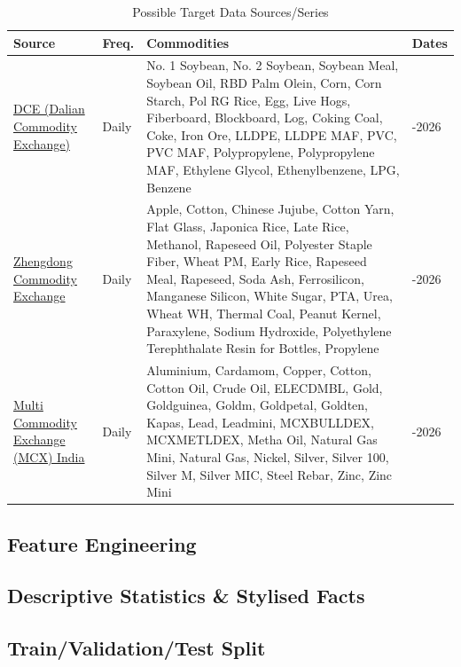 \vspace{-10pt}
\begin{table}[h!]
\caption{Possible Target Data Sources/Series}
\label{tab:target-data-sources}
\footnotesize

\begin{tabularx}{\textwidth}{
    @{}
    >{\raggedright\arraybackslash}p{}
    >{\raggedright\arraybackslash}p{}
    >{\raggedright\arraybackslash}X
    >{\raggedright\arraybackslash}p{}
    @{}
}
\toprule
\textbf{Source} &
\textbf{Freq.} &
\textbf{Commodities} &
\textbf{Dates} \\
\midrule
\href{http://www.dce.com.cn/dceg/channel/list/468.html}{DCE (Dalian Commodity Exchange)} &
Daily &
No. 1 Soybean, No. 2 Soybean, Soybean Meal, Soybean Oil,
RBD Palm Olein, Corn, Corn Starch, Pol RG Rice, Egg, Live Hogs,
Fiberboard, Blockboard, Log, Coking Coal, Coke, Iron Ore,
LLDPE, LLDPE MAF, PVC, PVC MAF, Polypropylene,
Polypropylene MAF, Ethylene Glycol, Ethenylbenzene, LPG,
Benzene &
2006-2026 \\
\midrule
\href{https://english.czce.com.cn/en/MarketData/HistoricalData/H081002017index_1.htm}{Zhengdong Commodity Exchange} &
Daily &
Apple, Cotton, Chinese Jujube, Cotton Yarn, Flat Glass, Japonica Rice, Late Rice, Methanol, Rapeseed Oil, Polyester Staple Fiber, Wheat PM, Early Rice, Rapeseed Meal, Rapeseed, Soda Ash, Ferrosilicon, Manganese Silicon, White Sugar, PTA, Urea, Wheat WH, Thermal Coal, Peanut Kernel, Paraxylene, Sodium Hydroxide, Polyethylene Terephthalate Resin for Bottles, Propylene &
2015-2026 \\
\midrule
\href{https://www.mcxindia.com/market-data/historical-data}{Multi Commodity Exchange (MCX) India} &
Daily &
Aluminium, Cardamom, Copper, Cotton, Cotton Oil, Crude Oil, ELECDMBL, Gold, Goldguinea, Goldm, Goldpetal, Goldten, Kapas, Lead, Leadmini, MCXBULLDEX, MCXMETLDEX, Metha Oil, Natural Gas Mini, Natural Gas, Nickel, Silver, Silver 100, Silver M, Silver MIC, Steel Rebar, Zinc, Zinc Mini&
2003-2026 \\
\bottomrule
\end{tabularx}
\end{table}



\subsection{Feature Engineering}    \label{subsec: data_feature engineering}
\subsection{Descriptive Statistics \& Stylised Facts}   \label{subsec: data_descriptive statistics}
\subsection{Train/Validation/Test Split}    \label{subsec: data_train validation test split}

